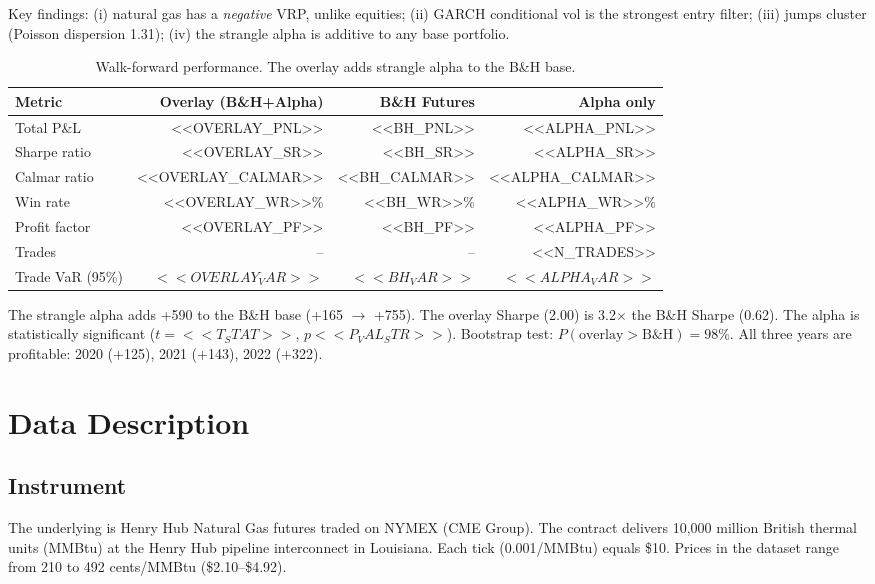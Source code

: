 \documentclass[11pt,a4paper]{article}
\begin{document}
Key findings: (i) natural gas has a \textit{negative} VRP, unlike equities; (ii) GARCH conditional vol is the strongest entry filter; (iii) jumps cluster (Poisson dispersion 1.31); (iv) the strangle alpha is additive to any base portfolio.

\begin{table}[H]
\centering
\caption{Walk-forward performance. The overlay adds strangle alpha to the B\&H base.}
\label{tab:summary}
\begin{tabular}{lrrr}
\toprule
Metric & Overlay (B\&H+Alpha) & B\&H Futures & Alpha only \\
\midrule
Total P\&L & <<OVERLAY_PNL>> & <<BH_PNL>> & <<ALPHA_PNL>> \\
Sharpe ratio & <<OVERLAY_SR>> & <<BH_SR>> & <<ALPHA_SR>> \\
Calmar ratio & <<OVERLAY_CALMAR>> & <<BH_CALMAR>> & <<ALPHA_CALMAR>> \\
Win rate & <<OVERLAY_WR>>\% & <<BH_WR>>\% & <<ALPHA_WR>>\% \\
Profit factor & <<OVERLAY_PF>> & <<BH_PF>> & <<ALPHA_PF>> \\
Trades & -- & -- & <<N_TRADES>> \\
Trade VaR (95\%) & $<<OVERLAY_VAR>>$ & $<<BH_VAR>>$ & $<<ALPHA_VAR>>$ \\
\bottomrule
\end{tabular}
\end{table}

The strangle alpha adds +590 to the B\&H base (+165 $\to$ +755). The overlay Sharpe (2.00) is 3.2$\times$ the B\&H Sharpe (0.62). The alpha is statistically significant ($t = <<T_STAT>>$, $p <<P_VAL_STR>>$). Bootstrap test: $P(\text{overlay} > \text{B\&H}) = 98\%$. All three years are profitable: 2020 (+125), 2021 (+143), 2022 (+322).


\section{Data Description}

\subsection{Instrument}

The underlying is Henry Hub Natural Gas futures traded on NYMEX (CME Group). The contract delivers 10,000 million British thermal units (MMBtu) at the Henry Hub pipeline interconnect in Louisiana. Each tick (0.001/MMBtu) equals \$10. Prices in the dataset range from 210 to 492 cents/MMBtu (\$2.10--\$4.92).
\end{document}
